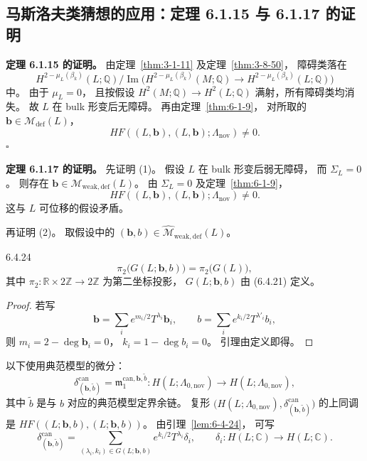 
\subsection{马斯洛夫类猜想的应用：定理 6.1.15 与 6.1.17 的证明}
\label{subsec:6-4-4}

\noindent\textbf{定理 6.1.15 的证明。}
由定理~\ref{thm:3-1-11}
及定理~\ref{thm:3-8-50}，
障碍类落在
\[
H^{2-\mu_L(\beta_k)}(L;\mathbb Q)
\big/
\operatorname{Im}\bigl(
H^{2-\mu_L(\beta_k)}(M;\mathbb Q)
\longrightarrow
H^{2-\mu_L(\beta_k)}(L;\mathbb Q)
\bigr)
\]
中。
由于 $\mu_L=0$，
且按假设
$H^2(M;\mathbb Q)\to H^2(L;\mathbb Q)$
满射，所有障碍类均消失。
故 $L$ 在 bulk 形变后无障碍。
再由定理~\ref{thm:6-1-9}，
对所取的
$\mathbf b\in\mathcal M_{\mathrm{def}}(L)$，
\[
HF((L,\mathbf b),(L,\mathbf b);
\Lambda_{\mathrm{nov}})\ne0.
\]
\hfill$\square$

\noindent\textbf{定理 6.1.17 的证明。}
先证明 \textup{(1)}。
假设 $L$ 在 bulk 形变后弱无障碍，
而 $\Sigma_L=0$。
则存在
$\mathbf b\in\mathcal M_{\mathrm{weak,def}}(L)$。
由 $\Sigma_L=0$
及定理~\ref{thm:6-1-9}，
\[
HF((L,\mathbf b),(L,\mathbf b);
\Lambda_{\mathrm{nov}})\ne0.
\]
这与 $L$ 可位移的假设矛盾。

再证明 \textup{(2)}。
取假设中的
$(\boldsymbol b,b)
\in\widehat{\mathcal M}_{\mathrm{weak,def}}(L)$。

\begin{lemma}{6.4.24}\label{lem:6-4-24}
\[
\pi_2\bigl(G(L;\boldsymbol b,b)\bigr)
=\pi_2\bigl(G(L)\bigr),
\]
其中 $\pi_2:\mathbb R\times2\mathbb Z\to2\mathbb Z$
为第二坐标投影，
$G(L;\boldsymbol b,b)$ 由 (6.4.21) 定义。
\end{lemma}

\begin{proof}
若写
\[
\boldsymbol b
=\sum_i e^{m_i/2}T^{\lambda_i}\boldsymbol b_i,
\qquad
b=\sum_i e^{k_i/2}T^{\lambda'_i}b_i,
\]
则
$m_i=2-\deg\boldsymbol b_i=0$，
$k_i=1-\deg b_i=0$。
引理由定义即得。
\end{proof}

\pagebreak
以下使用典范模型的微分：
\[
\delta^{\mathrm{can}}_{(\boldsymbol b,\widetilde b)}
=\mathfrak m_1^{\mathrm{can},\boldsymbol b,\widetilde b}
:H(L;\Lambda_{0,\mathrm{nov}})
\longrightarrow H(L;\Lambda_{0,\mathrm{nov}}),
\]
其中 $\widetilde b$ 是与 $b$ 对应的典范模型定界余链。
复形
$\bigl(H(L;\Lambda_{0,\mathrm{nov}}),
\delta^{\mathrm{can}}_{(\boldsymbol b,\widetilde b)}\bigr)$
的上同调是
$HF((L;\boldsymbol b,b),(L;\boldsymbol b,b))$。
由引理~\ref{lem:6-4-24}，
可写
\[
\delta^{\mathrm{can}}_{(\boldsymbol b,\widetilde b)}
=\sum_{(\lambda_i,k_i)\in G(L;\boldsymbol b,b)}
e^{k_i/2}T^{\lambda_i}\delta_i,
\qquad
\delta_i:H(L;\mathbb C)\longrightarrow H(L;\mathbb C).
\]

